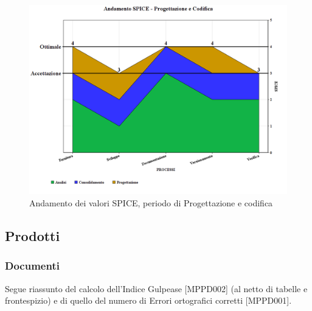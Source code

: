 \documentclass[openany,12pt,a4paper]{report}
\begin{document}
\begin{figure}[H]
	\includegraphics[scale=0.5]{verifica-progettazione-spice}
	\centering
	\caption{Andamento dei valori SPICE, periodo di Progettazione e codifica}
\end{figure}

\subsection{Prodotti}

\subsubsection{Documenti}

Segue riassunto del calcolo dell'Indice Gulpease [MPPD002] (al netto di tabelle e frontespizio) e di quello del numero di Errori ortografici corretti [MPPD001].
\end{document}
